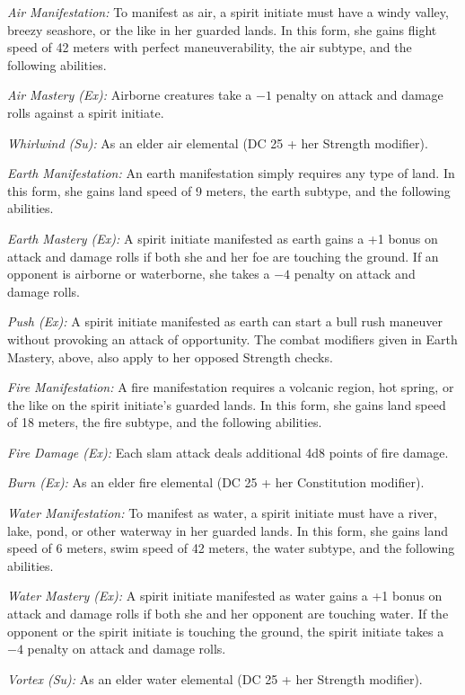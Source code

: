 \textit{Air Manifestation:} To manifest as air, a spirit initiate must have a windy valley, breezy seashore, or the like in her guarded lands. In this form, she gains flight speed of 42 meters with perfect maneuverability, the air subtype, and the following abilities.

\emph{Air Mastery (Ex):} Airborne creatures take a $-1$ penalty on attack and damage rolls against a spirit initiate.

\emph{Whirlwind (Su):} As an elder air elemental (DC 25 + her Strength modifier).


\textit{Earth Manifestation:} An earth manifestation simply requires any type of land. In this form, she gains land speed of 9 meters, the earth subtype, and the following abilities.

\emph{Earth Mastery (Ex):} A spirit initiate manifested as earth gains a +1 bonus on attack and damage rolls if both she and her foe are touching the ground. If an opponent is airborne or waterborne, she takes a $-4$ penalty on attack and damage rolls.

\emph{Push (Ex):} A spirit initiate manifested as earth can start a bull rush maneuver without provoking an attack of opportunity. The combat modifiers given in Earth Mastery, above, also apply to her opposed Strength checks.


\textit{Fire Manifestation:} A fire manifestation requires a volcanic region, hot spring, or the like on the spirit initiate's guarded lands. In this form, she gains land speed of 18 meters, the fire subtype, and the following abilities.

\emph{Fire Damage (Ex):} Each slam attack deals additional 4d8 points of fire damage.

\emph{Burn (Ex):} As an elder fire elemental (DC 25 + her Constitution modifier).


\textit{Water Manifestation:} To manifest as water, a spirit initiate must have a river, lake, pond, or other waterway in her guarded lands. In this form, she gains land speed of 6 meters, swim speed of 42 meters, the water subtype, and the following abilities.

\emph{Water Mastery (Ex):} A spirit initiate manifested as water gains a +1 bonus on attack and damage rolls if both she and her opponent are touching water. If the opponent or the spirit initiate is touching the ground, the spirit initiate takes a $-4$ penalty on attack and damage rolls.

\emph{Vortex (Su):} As an elder water elemental (DC 25 + her Strength modifier).
